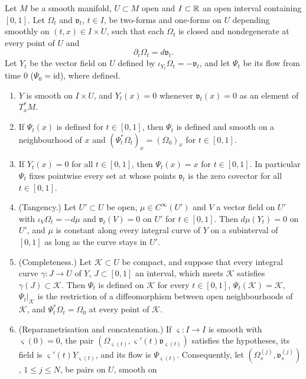 \begin{lemma}\label{I:lem:pre-moser}
Let $M$ be a smooth manifold, $U\subset M$ open and $I\subset\mathbb{R}$ an open interval containing $[0,1]$. Let $\Omega_t$ and
$\mathfrak v_t$, $t\in I$, be two-forms and one-forms on $U$ depending smoothly on $(t,x)\in I\times U$, such that each
$\Omega_t$ is closed and nondegenerate at every point of $U$ and
\[
 \partial_t\Omega_t=d\mathfrak v_t .
\]
Let $Y_t$ be the vector field on $U$ defined by $\iota_{Y_t}\Omega_t=-\mathfrak v_t$, and let $\Psi_t$ be its flow from time $0$
($\Psi_0=\mathrm{id}$), where defined.
\begin{enumerate}[label=(\alph*)]
\item $Y$ is smooth on $I\times U$, and $Y_t(x)=0$ whenever $\mathfrak v_t(x)=0$ as an element of $T_x^*M$.
\item If $\Psi_t(x)$ is defined for $t\in[0,1]$, then $\Psi_t$ is defined and smooth on a neighbourhood of $x$ and
$(\Psi_t^*\Omega_t)_x=(\Omega_0)_x$ for $t\in[0,1]$.
\item If $Y_t(x)=0$ for all $t\in[0,1]$, then $\Psi_t(x)=x$ for $t\in[0,1]$. In particular $\Psi_t$ fixes pointwise every set
at whose points $\mathfrak v_t$ is the zero covector for all $t\in[0,1]$.
\item (Tangency.) Let $U'\subset U$ be open, $\mu\in C^\infty(U')$ and $V$ a vector field on $U'$ with
$\iota_V\Omega_t=-d\mu$ and $\mathfrak v_t(V)=0$ on $U'$ for $t\in[0,1]$. Then $d\mu(Y_t)=0$ on $U'$, and $\mu$ is constant along
every integral curve of $Y$ on a subinterval of $[0,1]$ as long as the curve stays in $U'$.
\item (Completeness.) Let $\mathcal K\subset U$ be compact, and suppose that every integral curve $\gamma\colon J\to U$ of $Y$,
$J\subset[0,1]$ an interval, which meets $\mathcal K$ satisfies $\gamma(J)\subset\mathcal K$. Then $\Psi_t$ is defined on $\mathcal K$ for
every $t\in[0,1]$, $\Psi_t(\mathcal K)=\mathcal K$, $\Psi_t|_{\mathcal K}$ is the restriction of a diffeomorphism between open
neighbourhoods of $\mathcal K$, and $\Psi_t^*\Omega_t=\Omega_0$ at every point of $\mathcal K$.
\item (Reparametrisation and concatenation.) If $\varsigma\colon I\to I$ is smooth with $\varsigma(0)=0$, the pair
$(\Omega_{\varsigma(t)},\varsigma'(t)\mathfrak v_{\varsigma(t)})$ satisfies the hypotheses, its field is $\varsigma'(t)Y_{\varsigma(t)}$, and its flow is
$\Psi_{\varsigma(t)}$. Consequently, let $(\Omega^{(j)}_s,\mathfrak v^{(j)}_s)$, $1\le j\le N$, be pairs on $U$, smooth on

\end{enumerate}
\end{lemma}
